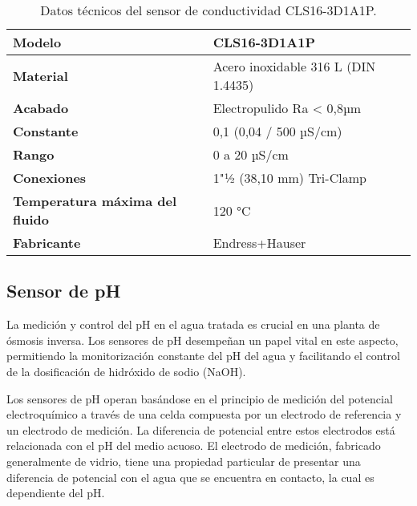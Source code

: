 \renewcommand{\arraystretch}{2}
\begin{table}[H]
    \centering
    \caption{Datos técnicos del sensor de conductividad CLS16-3D1A1P.}
    \label{table:sensorCLS16}
    \begin{tabular}{| L{6cm} | L{6cm} |}
        \hline
        \textbf{Modelo}                        & CLS16-3D1A1P                        \\
        \hline
        \textbf{Material}                      & Acero inoxidable 316 L (DIN 1.4435) \\
        \hline
        \textbf{Acabado}                       & Electropulido Ra < 0,8µm            \\
        \hline
        \textbf{Constante}                     & 0,1 (0,04 / 500 µS/cm)              \\
        \hline
        \textbf{Rango}                         & 0 a 20 µS/cm                        \\
        \hline
        \textbf{Conexiones}                    & 1"½ (38,10 mm) Tri-Clamp            \\
        \hline
        \textbf{Temperatura máxima del fluido} & 120 °C                              \\
        \hline
        \textbf{Fabricante}                    & Endress+Hauser                      \\
        \hline
    \end{tabular}
\end{table}




\subsection{Sensor de pH} \label{sec:sensor_ph}

La medición y control del pH en el agua tratada es crucial en una planta de ósmosis inversa. Los sensores de pH
desempeñan un papel vital en este aspecto, permitiendo la monitorización constante del pH del agua y facilitando
el control de la dosificación de hidróxido de sodio (NaOH).

Los sensores de pH operan basándose en el principio de medición del potencial electroquímico a través de una
celda compuesta por un electrodo de referencia y un electrodo de medición. La diferencia de potencial entre
estos electrodos está relacionada con el pH del medio acuoso. El electrodo de medición, fabricado generalmente
de vidrio, tiene una propiedad particular de presentar una diferencia de potencial con el agua que se encuentra en contacto, la cual es dependiente del pH.

